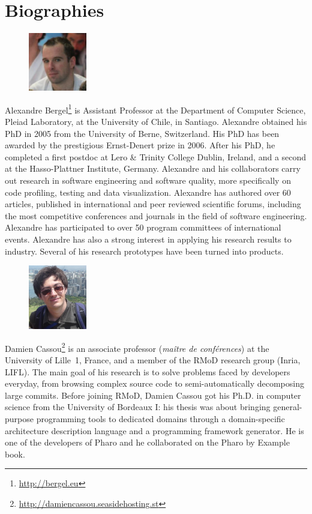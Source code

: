 \documentclass[a4paper,10pt,twoside]{book}
\begin{document}
	\sloppy
	\frontmatter
\fi
\chapter{Biographies}

\begin{figure}
\centering
\includegraphics[width=1in]{alexandre}
\end{figure}

Alexandre Bergel\footnote{\url{http://bergel.eu}} is Assistant Professor at the Department of Computer Science, Pleiad Laboratory, at the University of Chile, in Santiago.
Alexandre obtained his PhD in 2005 from the University of Berne, Switzerland. His PhD has been awarded by the prestigious Ernst-Denert prize in 2006. After his PhD, he completed a first postdoc at Lero \& Trinity College Dublin, Ireland, and a second at the Hasso-Plattner Institute, Germany. Alexandre and his collaborators carry out research in software engineering and software quality, more specifically on code profiling, testing and data visualization. Alexandre has authored over 60 articles, published in international and peer reviewed scientific forums, including the most competitive conferences and journals in the field of software engineering. Alexandre has participated to over 50 program committees of international events. Alexandre has also a strong interest in applying his research results to industry. Several of his research prototypes have been turned into products.


\begin{figure}
\centering
\includegraphics[width=1in]{damien}
\end{figure}
Damien Cassou\footnote{\url{http://damiencassou.seasidehosting.st}} is an associate professor (\textit{ma\^itre de
  conf\'erences}) at the University of Lille~1, France, and a member
of the RMoD research group (Inria, LIFL). The main goal of his
research is to solve problems faced by developers everyday, from
browsing complex source code to semi-automatically decomposing large
commits. Before joining RMoD, Damien Cassou got his Ph.D. in computer
science from the University of Bordeaux I: his thesis was about
bringing general-purpose programming tools to dedicated domains
through a domain-specific architecture description language and a
programming framework generator. He is one of the developers of Pharo
and he collaborated on the Pharo by Example book.
\end{document}
